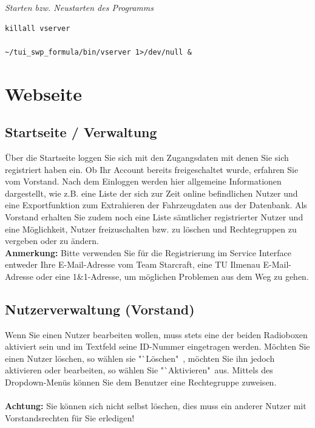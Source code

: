 \documentclass[fontsize = 12pt, paper = a4]{scrreprt}
\begin{document}
\textit{Starten bzw. Neustarten des Programms}

\vspace*{4mm}
\begin{lstlisting}[frame=single]
killall vserver

~/tui_swp_formula/bin/vserver 1>/dev/null &
\end{lstlisting} 
\vspace*{-2mm}












\section{Webseite}

\subsection{Startseite / Verwaltung}

Über die Startseite loggen Sie sich mit den Zugangsdaten mit denen Sie sich registriert haben ein. 
Ob Ihr Account bereits freigeschaltet wurde, erfahren Sie vom Vorstand. 
Nach dem Einloggen werden hier allgemeine Informationen dargestellt, wie z.B. eine Liste der sich zur Zeit online befindlichen Nutzer und eine Exportfunktion zum Extrahieren der Fahrzeugdaten aus der Datenbank. 
Als Vorstand erhalten Sie zudem noch eine Liste sämtlicher registrierter Nutzer und eine Möglichkeit, Nutzer freizuschalten bzw. zu löschen und Rechtegruppen zu vergeben oder zu ändern. \\

\textbf{Anmerkung:} Bitte verwenden Sie für die Registrierung im Service Interface entweder Ihre E-Mail-Adresse vom Team Starcraft, eine TU Ilmenau E-Mail-Adresse oder eine 1\&1-Adresse, um möglichen Problemen aus dem Weg zu gehen.

\subsection{Nutzerverwaltung (Vorstand)}

Wenn Sie einen Nutzer bearbeiten wollen, muss stets eine der beiden Radioboxen aktiviert sein und im Textfeld seine ID-Nummer eingetragen werden. Möchten Sie einen Nutzer löschen, so wählen sie "`Löschen"\ , möchten Sie ihn jedoch aktivieren oder bearbeiten, so wählen Sie "`Aktivieren"\ aus. Mittels des Dropdown-Menüs können Sie dem Benutzer eine Rechtegruppe zuweisen. \\ \\
\textbf{Achtung:} Sie können sich nicht selbst löschen, dies muss ein anderer Nutzer mit Vorstandsrechten für Sie erledigen!
\end{document}
